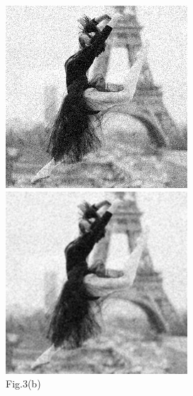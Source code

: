 \documentclass[12pt,a4paper,notitlepage,oneside,amsmath,amssymb]{article}
\begin{document}
\begin{CJK*}{UTF8}{bkai}
\begin{enumerate}[label=(\alph*)]
          \begin{figure}[hbt!]
            \centering
            \begin{minipage}{.25\textwidth}
              \centering
              \includegraphics[width=.97\linewidth]{sample4}
              \caption*{Fig.3(b)}
            \end{minipage}%
            \begin{minipage}{.25\textwidth}
              \centering
              \includegraphics[width=.97\linewidth]{imageN1}

\end{minipage}
\end{figure}
\end{enumerate}
\end{CJK*}
\end{document}
